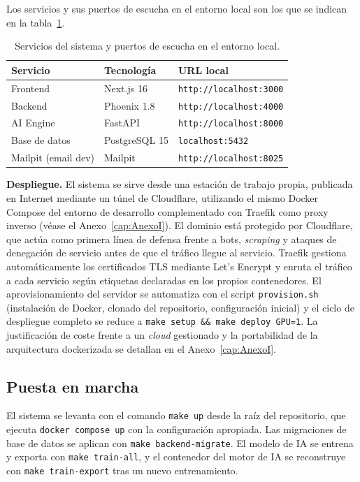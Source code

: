 Los servicios y sus puertos de escucha en el entorno local son los que se indican en la tabla~\ref{tab:servicios-puertos}.

\begin{table}[h]
\centering
\begin{tabular}{lll}
\hline
\textbf{Servicio} & \textbf{Tecnología} & \textbf{URL local} \\
\hline
Frontend & Next.js 16 & \texttt{http://localhost:3000} \\
Backend & Phoenix 1.8 & \texttt{http://localhost:4000} \\
AI Engine & FastAPI & \texttt{http://localhost:8000} \\
Base de datos & PostgreSQL 15 & \texttt{localhost:5432} \\
Mailpit (email dev) & Mailpit & \texttt{http://localhost:8025} \\
\hline
\end{tabular}
\caption{Servicios del sistema y puertos de escucha en el entorno local.}
\label{tab:servicios-puertos}
\end{table}

\textbf{Despliegue.} El sistema se sirve desde una estación de trabajo propia, publicada en Internet mediante un túnel de Cloudflare, utilizando el mismo Docker Compose del entorno de desarrollo complementado con Traefik como proxy inverso (véase el Anexo~\ref{cap:AnexoI}). El dominio está protegido por Cloudflare, que actúa como primera línea de defensa frente a bots, \emph{scraping} y ataques de denegación de servicio antes de que el tráfico llegue al servicio. Traefik gestiona automáticamente los certificados TLS mediante Let's Encrypt y enruta el tráfico a cada servicio según etiquetas declaradas en los propios contenedores. El aprovisionamiento del servidor se automatiza con el script \texttt{provision.sh} (instalación de Docker, clonado del repositorio, configuración inicial) y el ciclo de despliegue completo se reduce a \texttt{make setup \&\& make deploy GPU=1}. La justificación de coste frente a un \emph{cloud} gestionado y la portabilidad de la arquitectura dockerizada se detallan en el Anexo~\ref{cap:AnexoI}.

\subsection{Puesta en marcha}

El sistema se levanta con el comando \texttt{make up} desde la raíz del repositorio, que ejecuta \texttt{docker compose up} con la configuración apropiada. Las migraciones de base de datos se aplican con \texttt{make backend-migrate}. El modelo de IA se entrena y exporta con \texttt{make train-all}, y el contenedor del motor de IA se reconstruye con \texttt{make train-export} tras un nuevo entrenamiento.

